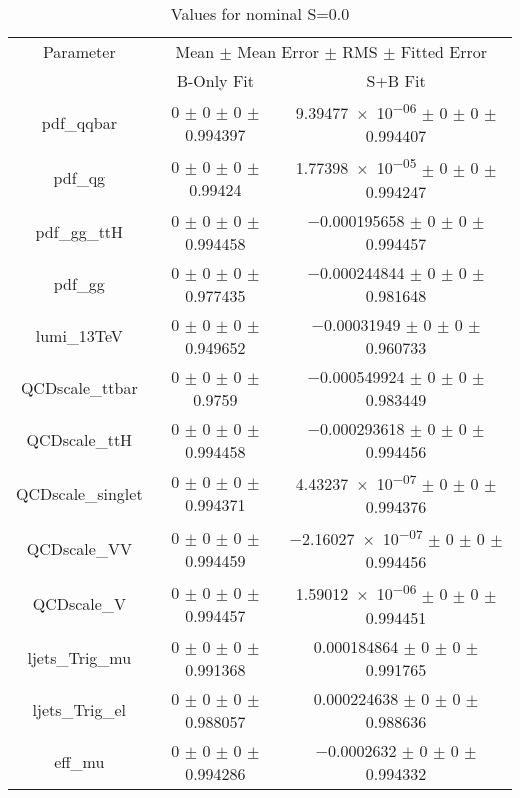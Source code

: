 \begin{table}
\centering
\caption{Values for nominal S=0.0}
\begin{tabular}{ccc}
\toprule
Parameter 	& \multicolumn{2}{c}{Mean $\pm$ Mean Error $\pm$ RMS $\pm$ Fitted Error}\\
 	& B-Only Fit & S+B Fit\\
\midrule
pdf\_qqbar 	& \num{0} $\pm$ \num{0} $\pm$ \num{0} $\pm$ \num{0.994397} 	& \num{9.39477e-06} $\pm$ \num{0} $\pm$ \num{0} $\pm$ \num{0.994407}\\
pdf\_qg 	& \num{0} $\pm$ \num{0} $\pm$ \num{0} $\pm$ \num{0.99424} 	& \num{1.77398e-05} $\pm$ \num{0} $\pm$ \num{0} $\pm$ \num{0.994247}\\
pdf\_gg\_ttH 	& \num{0} $\pm$ \num{0} $\pm$ \num{0} $\pm$ \num{0.994458} 	& \num{-0.000195658} $\pm$ \num{0} $\pm$ \num{0} $\pm$ \num{0.994457}\\
pdf\_gg 	& \num{0} $\pm$ \num{0} $\pm$ \num{0} $\pm$ \num{0.977435} 	& \num{-0.000244844} $\pm$ \num{0} $\pm$ \num{0} $\pm$ \num{0.981648}\\
lumi\_13TeV 	& \num{0} $\pm$ \num{0} $\pm$ \num{0} $\pm$ \num{0.949652} 	& \num{-0.00031949} $\pm$ \num{0} $\pm$ \num{0} $\pm$ \num{0.960733}\\
QCDscale\_ttbar 	& \num{0} $\pm$ \num{0} $\pm$ \num{0} $\pm$ \num{0.9759} 	& \num{-0.000549924} $\pm$ \num{0} $\pm$ \num{0} $\pm$ \num{0.983449}\\
QCDscale\_ttH 	& \num{0} $\pm$ \num{0} $\pm$ \num{0} $\pm$ \num{0.994458} 	& \num{-0.000293618} $\pm$ \num{0} $\pm$ \num{0} $\pm$ \num{0.994456}\\
QCDscale\_singlet 	& \num{0} $\pm$ \num{0} $\pm$ \num{0} $\pm$ \num{0.994371} 	& \num{4.43237e-07} $\pm$ \num{0} $\pm$ \num{0} $\pm$ \num{0.994376}\\
QCDscale\_VV 	& \num{0} $\pm$ \num{0} $\pm$ \num{0} $\pm$ \num{0.994459} 	& \num{-2.16027e-07} $\pm$ \num{0} $\pm$ \num{0} $\pm$ \num{0.994456}\\
QCDscale\_V 	& \num{0} $\pm$ \num{0} $\pm$ \num{0} $\pm$ \num{0.994457} 	& \num{1.59012e-06} $\pm$ \num{0} $\pm$ \num{0} $\pm$ \num{0.994451}\\
ljets\_Trig\_mu 	& \num{0} $\pm$ \num{0} $\pm$ \num{0} $\pm$ \num{0.991368} 	& \num{0.000184864} $\pm$ \num{0} $\pm$ \num{0} $\pm$ \num{0.991765}\\
ljets\_Trig\_el 	& \num{0} $\pm$ \num{0} $\pm$ \num{0} $\pm$ \num{0.988057} 	& \num{0.000224638} $\pm$ \num{0} $\pm$ \num{0} $\pm$ \num{0.988636}\\
eff\_mu 	& \num{0} $\pm$ \num{0} $\pm$ \num{0} $\pm$ \num{0.994286} 	& \num{-0.0002632} $\pm$ \num{0} $\pm$ \num{0} $\pm$ \num{0.994332}\\

\end{tabular}
\end{table}
